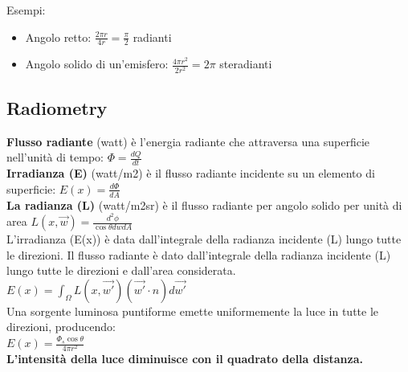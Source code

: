 Esempi:
\begin{itemize}
    \item Angolo retto: $\frac{2 \pi r}{4 r} = \frac{\pi}{2}$ radianti
    \item Angolo solido di un'emisfero: $\frac{4 \pi r^2}{2 r^2} = 2 \pi$ steradianti
\end{itemize}
\subsection{Radiometry}
\textbf{Flusso radiante} (watt) è l'energia radiante che attraversa una superficie nell'unità di tempo:
$\Phi= \frac{dQ}{dt} $ \\
\textbf{Irradianza (E)} (watt/m2) è il flusso radiante incidente su un elemento di superficie:
$E(x)= \frac{d\Phi}{dA} $ \\
\textbf{La radianza (L)} (watt/m2sr) è il flusso radiante per angolo solido per unità di area
$L(x,\vec{w})= \frac{d^2\phi}{\cos\theta dwdA} $ \\
L'irradianza (E(x)) è data dall'integrale della radianza incidente (L) lungo tutte le direzioni.
Il flusso radiante è dato dall'integrale della radianza incidente (L) lungo tutte le direzioni e dall'area considerata.
$E(x)=\int_{\Omega}{} L(x,\vec{w'})(\vec{w'}\cdot n)d\vec{w'} \, $ \\
Una sorgente luminosa puntiforme emette uniformemente la luce in tutte le direzioni, producendo: \\
$E(x)=\frac{\Phi_s \cos \theta}{4\pi r^2 }$ \\
\textbf{L'intensità della luce diminuisce con il quadrato della distanza.}
